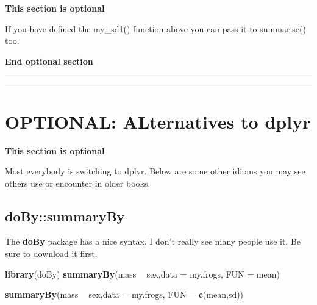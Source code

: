 \documentclass[]{book}
\newenvironment{Shaded}{\begin{snugshade}}{\end{snugshade}}
\newcommand{\KeywordTok}[1]{\textcolor[rgb]{0.13,0.29,0.53}{\textbf{#1}}}
\newcommand{\DataTypeTok}[1]{\textcolor[rgb]{0.13,0.29,0.53}{#1}}
\newcommand{\StringTok}[1]{\textcolor[rgb]{0.31,0.60,0.02}{#1}}
\newcommand{\OperatorTok}[1]{\textcolor[rgb]{0.81,0.36,0.00}{\textbf{#1}}}
\newcommand{\NormalTok}[1]{#1}
\theoremstyle{definition}
\theoremstyle{definition}
\theoremstyle{definition}
\theoremstyle{remark}
\begin{document}
\textbf{This section is optional}

If you have defined the my\_sd1() function above you can pass it to
summarise() too.

\begin{Shaded}
\end{Shaded}

\textbf{End optional section}

\begin{center}\rule{0.5\linewidth}{\linethickness}\end{center}

\begin{center}\rule{0.5\linewidth}{\linethickness}\end{center}

\section{OPTIONAL: ALternatives to
dplyr}\label{optional-alternatives-to-dplyr}

\textbf{This section is optional}

Most everybody is switching to dplyr. Below are some other idioms you
may see others use or encounter in older books.

\subsection{doBy::summaryBy}\label{dobysummaryby}

The \textbf{doBy} package has a nice syntax. I don't really see many
people use it. Be sure to download it first.

\begin{Shaded}
\begin{Highlighting}[]
\KeywordTok{library}\NormalTok{(doBy)}
\KeywordTok{summaryBy}\NormalTok{(mass }\OperatorTok{~}\StringTok{ }\NormalTok{sex,}\DataTypeTok{data =}\NormalTok{ my.frogs, }\DataTypeTok{FUN =}\NormalTok{ mean)}

\KeywordTok{summaryBy}\NormalTok{(mass }\OperatorTok{~}\StringTok{ }\NormalTok{sex,}\DataTypeTok{data =}\NormalTok{ my.frogs, }\DataTypeTok{FUN =} \KeywordTok{c}\NormalTok{(mean,sd))}
\end{Highlighting}
\end{Shaded}
\end{document}
